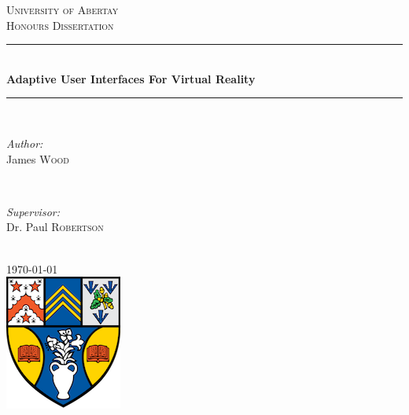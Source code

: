 \documentclass[11pt]{article}
\begin{document}
\begin{titlepage}

\newcommand{\HRule}{\rule{\linewidth}{0.5mm}}

\center

\textsc{\LARGE University of Abertay}\\[1.5cm]
\textsc{\Large Honours Dissertation}\\[0.5cm]

\HRule \\[0.4cm]
{ \huge \bfseries Adaptive User Interfaces For Virtual Reality}\\[0.4cm]
\HRule \\[1.5cm]

\begin{minipage}{0.4\textwidth}
\begin{flushleft} \large
\emph{Author:}\\
James \textsc{Wood}
\end{flushleft}
\end{minipage}
~
\begin{minipage}{0.4\textwidth}
\begin{flushright} \large
\emph{Supervisor:} \\
Dr. Paul \textsc{Robertson}
\end{flushright}
\end{minipage}\\[2cm]

{\large \today}\\[2cm]

\includegraphics{logo.png}\\[1cm]

\vfill

\end{titlepage}

\pagebreak

\setcounter{page}{1}
\end{document}
